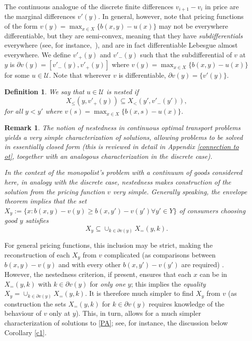 \documentclass[12pt,reqno]{amsart}
\newtheorem{definition}{Definition}
\newtheorem{remark}{Remark}
\begin{document}
 The continuous analogue of the discrete finite differences $v_{i+1}-v_i$ in price are the marginal differences $v'(y)$.  In general, however, note that pricing functions of the form $v(y)=\max_{x\in X}\{b(x,y)-u(x)\}$ may not be everywhere differentiable, but they are semi-convex, meaning that they have \textit{subdifferentials} everywhere (see, for instance,~\cite{Rockafellar1970}), and are in fact differentiable Lebesgue almost everywhere. 
We define $v'_+(y)$ and $v'_-(y)$ such that the subdifferential of $v$ at $y$ is  $\partial v(y)=[v'_-(y),v'_+(y)]$ where $v(y)=\max_{x\in X}\{b(x,y)-u(x)\}$ for some $u\in\mathcal{U}.$  Note that wherever $v$ is differentiable, $\partial v(y) =\{v'(y)\}$.

\begin{definition}
    We say that $u\in\mathcal{U}$ is nested  if 
    \[ X_{\le}(y,v'_+(y))\subseteq X_{<}(y',v'_-(y')),\] 
     for all $y<y'$   where  $v(s)=\max_{x\in X}\{b(x,s)-u(x)\}$.
\end{definition}
 \begin{remark}
The notion of nestedness in continuous optimal transport problems yields a very simple characterization of solutions, allowing problems to be solved in essentially closed form \cite{ChiapporiMcCannPass17} (this is reviewed in detail in Appendix \ref{connection to ot}, toegether with an analogous characterization in the discrete case).

In the context of the monopolist's problem with a continuum of goods considered here, in analogy with the discrete case, nestedness makes construction of the solution from the pricing function $v$ very simple.  Generally speaking, the envelope theorem implies that the set $X_y:=\{x: b(x,y) -v(y) \geq b(x,y')-v(y') \forall y' \in Y\}$ of consumers choosing good $y$ satisfies 
    $$
    X_y \subseteq \cup_{k \in \partial v(y)}X_=(y,k).
    $$
\end{remark}
For general pricing functions, this inclusion may be strict, making the reconstruction of each $X_y$ from $v$ complicated (as comparisons between $b(x,y) -v(y)$ and  with every other $b(x,y')-v(y')$ are required) .  However, the nestedness criterion, if present, ensures that each $x$ can be in $X_=(y,k) $ with $k \in \partial v(y)$ for \textit{only one} $y$; this implies the \textit{equality} $X_y = \cup_{k \in \partial v(y)}X_=(y,k) $.  It is therefore much simpler to find $X_y$ from $v$ (as construction the sets $X_=(y,k)$ for $k \in \partial v(y)$ requires knowledge of the behaviour of $v$ only at $y$). This, in turn, allows for a much simpler characterization of solutions to \eqref{PA}; see, for instance, the discussion below Corollary \ref{c1}.
\end{document}
